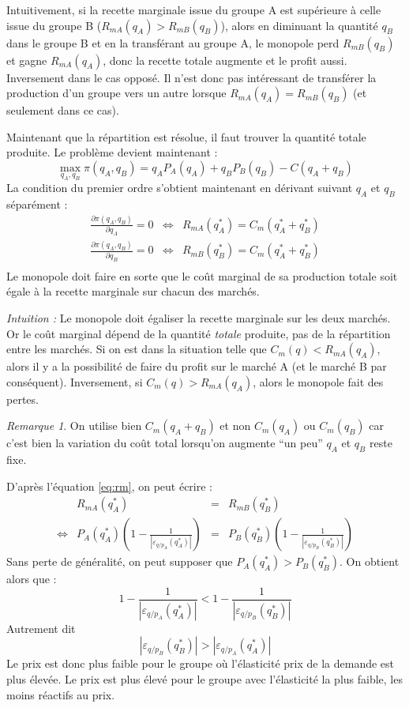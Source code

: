 \documentclass[
  a4paper,
]{book}
\theoremstyle{definition}
\theoremstyle{definition}
\theoremstyle{definition}
\theoremstyle{definition}
\theoremstyle{remark}
\newtheorem*{remark}{Remarque}
\begin{document}
Intuitivement, si la recette marginale issue du groupe A est supérieure à celle issue du groupe B (\(R_{mA}(q_A) > R_{mB}(q_B)\)), alors en diminuant la quantité \(q_B\) dans le groupe B et en la transférant au groupe A, le monopole perd \(R_{mB}(q_B)\) et gagne \(R_{mA}(q_A)\), donc la recette totale augmente et le profit aussi.
Inversement dans le cas opposé.
Il n'est donc pas intéressant de transférer la production d'un groupe vers un autre lorsque \(R_{mA}(q_A) = R_{mB}(q_B)\) (et seulement dans ce cas).

Maintenant que la répartition est résolue, il faut trouver la quantité totale produite.
Le problème devient maintenant :
\[
\max_{q_A, q_B} \pi(q_A, q_B) = q_AP_A(q_A) + q_BP_B(q_B) -C(q_A+q_B)
\]
La condition du premier ordre s'obtient maintenant en dérivant suivant \(q_A\) et \(q_B\) séparément :
\[
\begin{array}{rcl}
\frac{\partial\pi(q_A, q_B)}{\partial q_A} = 0&\Leftrightarrow& R_{mA}(q_A^*) = C_m(q_A^*+q_B^*)\\
\frac{\partial\pi(q_A, q_B)}{\partial q_B} = 0&\Leftrightarrow& R_{mB}(q_B^*) = C_m(q_A^*+q_B^*)\\
\end{array}
\]
Le monopole doit faire en sorte que le coût marginal de sa production totale soit égale à la recette marginale sur chacun des marchés.

\emph{Intuition :}
Le monopole doit égaliser la recette marginale sur les deux marchés.
Or le coût marginal dépend de la quantité \emph{totale} produite, pas de la répartition entre les marchés.
Si on est dans la situation telle que \(C_m(q)<R_{mA}(q_A)\), alors il y a la possibilité de faire du profit sur le marché A (et le marché B par conséquent).
Inversement, si \(C_m(q)>R_{mA}(q_A)\), alors le monopole fait des pertes.

\begin{remark}
On utilise bien \(C_m(q_A+q_B)\) et non \(C_m(q_A)\) ou \(C_m(q_B)\) car c'est bien la variation du coût total lorsqu'on augmente ``un peu'' \(q_A\) et \(q_B\) reste fixe.
\end{remark}

D'après l'équation \eqref{eq:rm}, on peut écrire :
\[
\begin{array}{crcl}
&R_{mA}(q_A^*) &=& R_{mB}(q_B^*)\\
\Leftrightarrow & P_A(q_A^*)\left(1-\frac{1}{\left|\varepsilon_{q/p_A}(q^*_A)\right|}\right) & = & P_B(q_B^*)\left(1-\frac{1}{\left|\varepsilon_{q/p_B}(q_B^*)\right|}\right)
\end{array}
\]
Sans perte de généralité, on peut supposer que \(P_A(q_A^*)> P_B(q_B^*)\).
On obtient alors que :
\[
1-\frac{1}{\left|\varepsilon_{q/p_A}(q_A^*)\right|} <1-\frac{1}{\left|\varepsilon_{q/p_B}(q_B^*)\right|}
\]
Autrement dit
\[
\left|\varepsilon_{q/p_B}(q_B^*)\right|>\left|\varepsilon_{q/p_A}(q^*_A)\right|
\]
Le prix est donc plus faible pour le groupe où l'élasticité prix de la demande est plus élevée.
Le prix est plus élevé pour le groupe avec l'élasticité la plus faible, les moins réactifs au prix.
\end{document}
